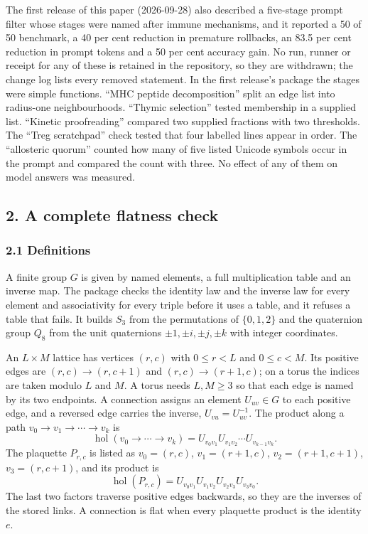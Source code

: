 \documentclass[
  11pt,
]{article}
\begin{document}
The first release of this paper (2026-09-28) also described a five-stage
prompt filter whose stages were named after immune mechanisms, and it
reported a 50 of 50 benchmark, a 40 per cent reduction in premature
rollbacks, an 83.5 per cent reduction in prompt tokens and a 50 per cent
accuracy gain. No run, runner or receipt for any of these is retained in
the repository, so they are withdrawn; the change log lists every
removed statement. In the first release's package the stages were simple
functions. ``MHC peptide decomposition'' split an edge list into
radius-one neighbourhoods. ``Thymic selection'' tested membership in a
supplied list. ``Kinetic proofreading'' compared two supplied fractions
with two thresholds. The ``Treg scratchpad'' check tested that four
labelled lines appear in order. The ``allosteric quorum'' counted how
many of five listed Unicode symbols occur in the prompt and compared the
count with three. No effect of any of them on model answers was
measured.

\subsection{2. A complete flatness
check}\label{a-complete-flatness-check}

\subsubsection{2.1 Definitions}\label{definitions}

A finite group \(G\) is given by named elements, a full multiplication
table and an inverse map. The package checks the identity law and the
inverse law for every element and associativity for every triple before
it uses a table, and it refuses a table that fails. It builds \(S_3\)
from the permutations of \(\{0,1,2\}\) and the quaternion group \(Q_8\)
from the unit quaternions \(\pm 1, \pm i, \pm j, \pm k\) with integer
coordinates.

An \(L \times M\) lattice has vertices \((r,c)\) with \(0 \le r < L\)
and \(0 \le c < M\). Its positive edges are \((r,c) \to (r,c+1)\) and
\((r,c) \to (r+1,c)\); on a torus the indices are taken modulo \(L\) and
\(M\). A torus needs \(L, M \ge 3\) so that each edge is named by its
two endpoints. A connection assigns an element \(U_{uv} \in G\) to each
positive edge, and a reversed edge carries the inverse,
\(U_{vu} = U_{uv}^{-1}\). The product along a path
\(v_0 \to v_1 \to \cdots \to v_k\) is
\[\operatorname{hol}(v_0 \to \cdots \to v_k) = U_{v_0 v_1} U_{v_1 v_2} \cdots U_{v_{k-1} v_k}.\]
The plaquette \(P_{r,c}\) is listed as \(v_0 = (r,c)\),
\(v_1 = (r+1,c)\), \(v_2 = (r+1,c+1)\), \(v_3 = (r,c+1)\), and its
product is
\[\operatorname{hol}(P_{r,c}) = U_{v_0 v_1} U_{v_1 v_2} U_{v_2 v_3} U_{v_3 v_0}.\]
The last two factors traverse positive edges backwards, so they are the
inverses of the stored links. A connection is flat when every plaquette
product is the identity \(e\).
\end{document}
